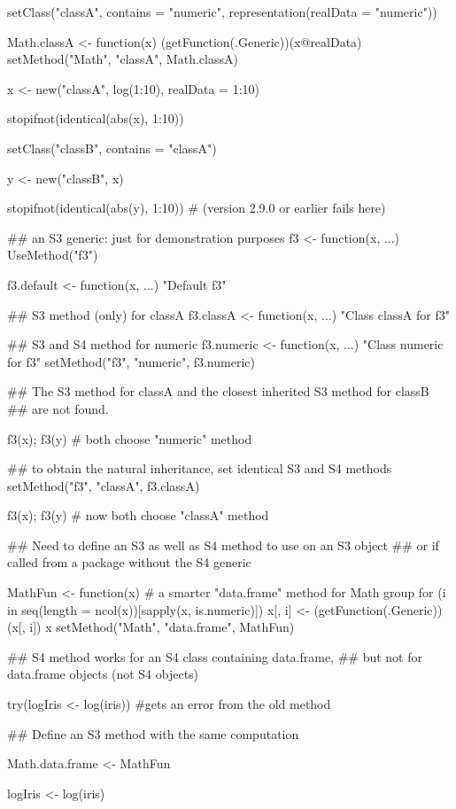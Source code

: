 \begin{Examples}
\begin{ExampleCode}
setClass("classA", contains = "numeric",
   representation(realData = "numeric"))

Math.classA <- function(x) {(getFunction(.Generic))(x@realData)}
setMethod("Math", "classA", Math.classA)


x <- new("classA", log(1:10), realData = 1:10)

stopifnot(identical(abs(x), 1:10))

setClass("classB", contains = "classA")

y <- new("classB", x)

stopifnot(identical(abs(y), 1:10)) # (version 2.9.0 or earlier fails here)

## an S3 generic: just for demonstration purposes
f3 <- function(x, ...) UseMethod("f3")

f3.default <- function(x, ...) "Default f3"

## S3 method (only) for classA
f3.classA <- function(x, ...) "Class classA for f3"

## S3 and S4 method for numeric
f3.numeric <- function(x, ...) "Class numeric for f3"
setMethod("f3", "numeric", f3.numeric)

## The S3 method for classA and the closest inherited S3 method for classB
## are not found.

f3(x); f3(y) # both choose "numeric" method

## to obtain the natural inheritance, set identical S3 and S4 methods
setMethod("f3", "classA", f3.classA)

f3(x); f3(y) # now both choose "classA" method

## Need to define an S3 as well as S4 method to use on an S3 object
## or if called from a package without the S4 generic

MathFun <- function(x) { # a smarter "data.frame" method for Math group
  for (i in seq(length = ncol(x))[sapply(x, is.numeric)])
    x[, i] <- (getFunction(.Generic))(x[, i])
  x
}
setMethod("Math", "data.frame", MathFun)

## S4 method works for an S4 class containing data.frame,
## but not for data.frame objects (not S4 objects)

try(logIris <- log(iris)) #gets an error from the old method

## Define an S3 method with the same computation

Math.data.frame <- MathFun

logIris <- log(iris)






\end{ExampleCode}
\end{Examples}
